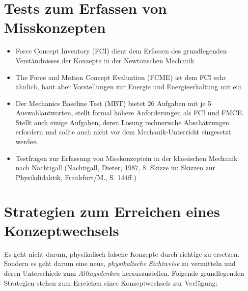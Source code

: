 \bip\bip
\section{Tests zum Erfassen von Misskonzepten}

\begin{itemize}
\item Force Concept Inventory (FCI) dient dem Erfassen des grundlegenden Verst\"{a}ndnisses der Konzepte in der Newtonschen Mechanik
\item The Force and Motion Concept Evaluation (FCME) ist dem FCI sehr \"{a}hnlich, baut aber Vorstellungen zur Energie und Energieerhaltung mit ein
\item Der Mechanics Baseline Test (MBT) bietet 26 Aufgaben mit je 5 Auswahlantworten, stellt formal h\"{o}here Anforderungen als FCI und FMCE. Stellt auch einige Aufgaben, deren L\"{o}sung rechnerische Absch\"{a}tzungen erfordern und sollte auch nicht vor dem Mechanik-Unterricht eingesetzt werden.
\item Testfragen zur Erfassung von Misskonzeptein in der klassischen Mechanik nach Nachtigall (Nachtigall, Dieter, 1987, 8. Skizze in: Skizzen zur Physikdidaktik, Frankfurt/M., S. 144ff.)
\end{itemize}

\bip\bip
\section{Strategien zum Erreichen eines Konzeptwechsels}
Es geht nicht darum, physikalisch falsche Konzepte durch richtige zu ersetzen. Sondern es geht darum eine neue, \emph{physikalische Sichtweise} zu vermitteln und deren Unterschiede zum \emph{Alltagsdenken} herauszustellen. Folgende grundlegenden Strategien stehen zum Erreichen eines Konzeptwechsels zur Verf{\"u}gung:


